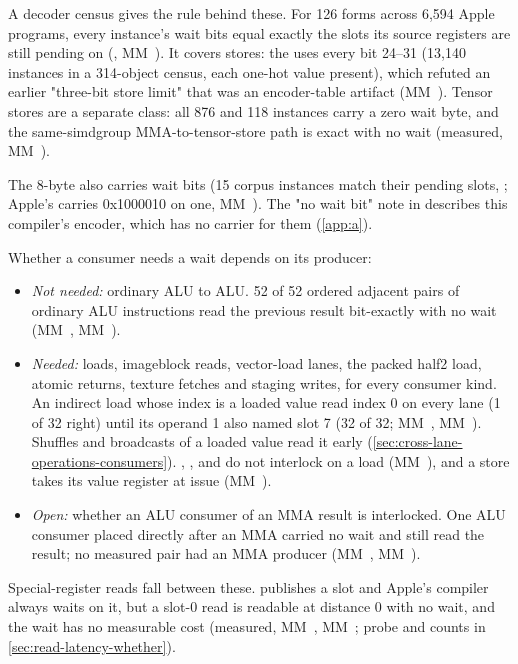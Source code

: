 A decoder census gives the rule behind these. For 126 forms across 6,594 Apple programs, every instance's wait bits equal
exactly the slots its source registers are still pending on (, MM~). It covers
stores: the  uses every bit 24--31 (13,140 instances in a 314-object census, each one-hot
value present), which refuted an earlier "three-bit store limit" that was an encoder-table artifact (MM~). Tensor stores
are a separate class: all 876  and 118  instances carry a zero wait
byte, and the same-simdgroup MMA-to-tensor-store path is exact with no wait (measured, MM~).

The 8-byte  also carries wait bits (15 corpus instances match their pending
slots, ; Apple's  carries 0x1000010 on one, MM~). The "no wait bit" note
in  describes this compiler's encoder, which has no carrier for them (\cref{app:a}).

Whether a consumer needs a wait depends on its producer:

\begin{itemize}
\item \emph{Not needed:} ordinary ALU to ALU. 52 of 52 ordered adjacent pairs of ordinary ALU instructions read the previous
  result bit-exactly with no wait (MM~, MM~).
\item \emph{Needed:} loads, imageblock reads, vector-load lanes, the packed half2 load, atomic returns, texture fetches and staging
  writes, for every consumer kind. An indirect load whose index is a loaded value read index 0 on every
  lane (1 of 32 right) until its operand 1 also named slot 7 (32 of 32; MM~, MM~). Shuffles and
  broadcasts of a loaded value read it early (\cref{sec:cross-lane-operations-consumers}). , ,
   and  do not interlock on a load (MM~), and a store takes its value register at issue
  (MM~).
\item \emph{Open:} whether an ALU consumer of an MMA result is interlocked. One ALU consumer placed directly after an MMA carried
  no wait and still read the result; no measured pair had an MMA producer (MM~, MM~).
\end{itemize}

Special-register reads fall between these.  publishes a slot and Apple's compiler always waits on it, but a
slot-0 read is readable at distance 0 with no wait, and the wait has no measurable cost (measured, MM~,
MM~; probe and counts in \cref{sec:read-latency-whether}).

